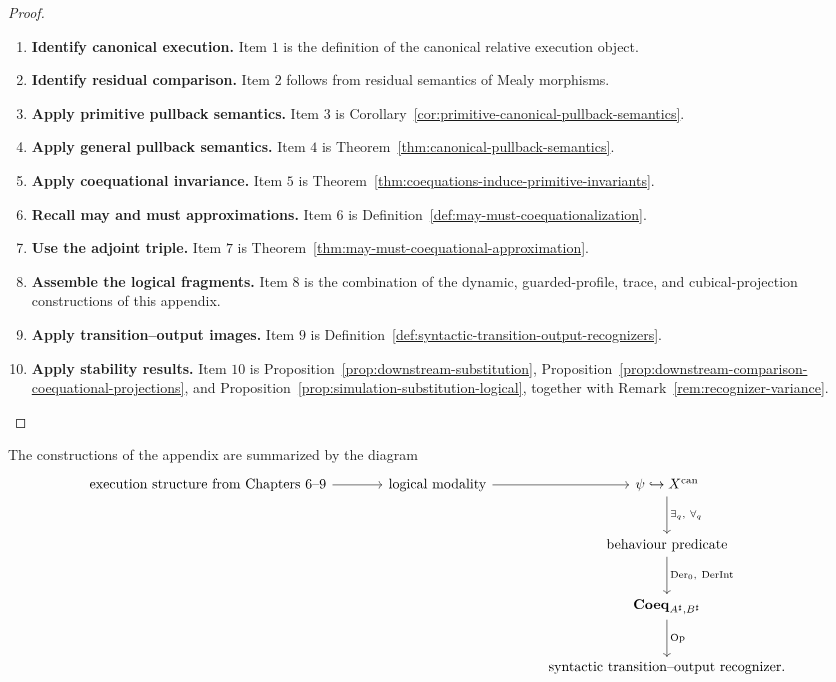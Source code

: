 \begin{proof}
\leavevmode
\begin{enumerate}
  \item \textbf{Identify canonical execution.}
  Item \(1\) is the definition of the canonical relative execution object.

  \item \textbf{Identify residual comparison.}
  Item \(2\) follows from residual semantics of Mealy morphisms.

  \item \textbf{Apply primitive pullback semantics.}
  Item \(3\) is
  Corollary~\ref{cor:primitive-canonical-pullback-semantics}.

  \item \textbf{Apply general pullback semantics.}
  Item \(4\) is Theorem~\ref{thm:canonical-pullback-semantics}.

  \item \textbf{Apply coequational invariance.}
  Item \(5\) is
  Theorem~\ref{thm:coequations-induce-primitive-invariants}.

  \item \textbf{Recall may and must approximations.}
  Item \(6\) is
  Definition~\ref{def:may-must-coequationalization}.

  \item \textbf{Use the adjoint triple.}
  Item \(7\) is
  Theorem~\ref{thm:may-must-coequational-approximation}.

  \item \textbf{Assemble the logical fragments.}
  Item \(8\) is the combination of the dynamic, guarded-profile, trace, and
  cubical-projection constructions of this appendix.

  \item \textbf{Apply transition--output images.}
  Item \(9\) is
  Definition~\ref{def:syntactic-transition-output-recognizers}.

  \item \textbf{Apply stability results.}
  Item \(10\) is Proposition~\ref{prop:downstream-substitution},
  Proposition~\ref{prop:downstream-comparison-coequational-projections}, and
  Proposition~\ref{prop:simulation-substitution-logical}, together with
  Remark~\ref{rem:recognizer-variance}.
\end{enumerate}
\end{proof}

The constructions of the appendix are summarized by the diagram
\[
\begin{tikzcd}[column sep=large,row sep=large]
\text{execution structure from Chapters 6--9}
  \arrow[r]
&
\text{logical modality}
  \arrow[r]
&
\psi\hookrightarrow X^{\mathrm{can}}
  \arrow[d, "{\exists_q,\ \forall_q}"]
\\
&
&
\text{behaviour predicate}
  \arrow[d, "{\mathrm{Der}_0,\ \mathrm{DerInt}}"]
\\
&
&
\mathbf{Coeq}_{A^\sharp,B^\sharp}
  \arrow[d, "\operatorname{Op}"]
\\
&
&
\text{syntactic transition--output recognizer}.
\end{tikzcd}
\]

